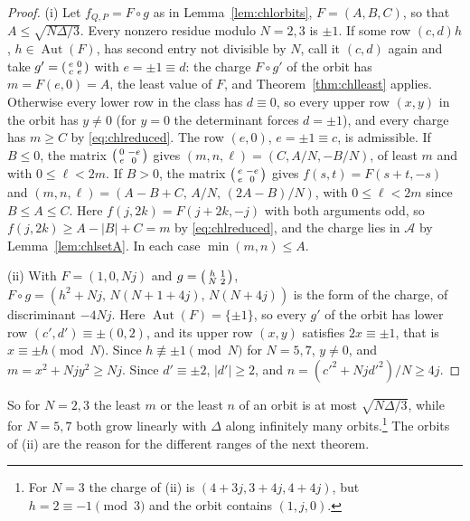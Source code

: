 \begin{proof}
(i) Let $f_{Q,P}=F\circ g$ as in Lemma~\ref{lem:chlorbits}, $F=(A,B,C)$, so that $A\le\sqrt{N\Delta/3}$. Every nonzero residue modulo $N=2,3$ is $\pm1$. If some row $(c,d)h$, $h\in\operatorname{Aut}(F)$, has second entry not divisible by $N$, call it $(c,d)$ again and take $g'=\begin{psmallmatrix}e&0\\c&e\end{psmallmatrix}$ with $e=\pm1\equiv d$: the charge $F\circ g'$ of the orbit has $m=F(e,0)=A$, the least value of $F$, and Theorem~\ref{thm:chlleast} applies. Otherwise every lower row in the class has $d\equiv0$, so every upper row $(x,y)$ in the orbit has $y\ne0$ (for $y=0$ the determinant forces $d=\pm1$), and every charge has $m\ge C$ by \eqref{eq:chlreduced}. The row $(e,0)$, $e=\pm1\equiv c$, is admissible. If $B\le0$, the matrix $\begin{psmallmatrix}0&-e\\e&0\end{psmallmatrix}$ gives $(m,n,\ell)=(C,A/N,-B/N)$, of least $m$ and with $0\le\ell<2m$. If $B>0$, the matrix $\begin{psmallmatrix}e&-e\\e&0\end{psmallmatrix}$ gives $f(s,t)=F(s+t,-s)$ and $(m,n,\ell)=(A-B+C,\,A/N,\,(2A-B)/N)$, with $0\le\ell<2m$ since $B\le A\le C$. Here $f(j,2k)=F(j+2k,-j)$ with both arguments odd, so $f(j,2k)\ge A-|B|+C=m$ by \eqref{eq:chlreduced}, and the charge lies in $\mathcal A$ by Lemma~\ref{lem:chlsetA}. In each case $\min(m,n)\le A$.

(ii) With $F=(1,0,Nj)$ and $g=\begin{psmallmatrix}h&1\\N&2\end{psmallmatrix}$, $F\circ g=(h^2+Nj,\,N(N+1+4j),\,N(N+4j))$ is the form of the charge, of discriminant $-4Nj$. Here $\operatorname{Aut}(F)=\{\pm1\}$, so every $g'$ of the orbit has lower row $(c',d')\equiv\pm(0,2)$, and its upper row $(x,y)$ satisfies $2x\equiv\pm1$, that is $x\equiv\pm h\pmod N$. Since $h\not\equiv\pm1\pmod N$ for $N=5,7$, $y\ne0$, and $m=x^2+Njy^2\ge Nj$. Since $d'\equiv\pm2$, $|d'|\ge2$, and $n=(c'^2+Njd'^2)/N\ge4j$.
\end{proof}

So for $N=2,3$ the least $m$ or the least $n$ of an orbit is at most $\sqrt{N\Delta/3}$, while for $N=5,7$ both grow linearly with $\Delta$ along infinitely many orbits.\footnote{For $N=3$ the charge of (ii) is $(4+3j,3+4j,4+4j)$, but $h=2\equiv-1\pmod 3$ and the orbit contains $(1,j,0)$.} The orbits of (ii) are the reason for the different ranges of the next theorem.

